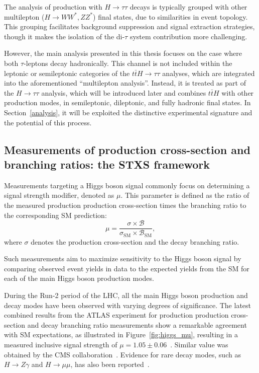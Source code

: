 The analysis of \ttH production with $H\to\tau\tau$ decays is typically grouped with other multilepton ($H\to WW^*, ZZ^*$) final states, due to similarities in event topology. This grouping facilitates background suppression and signal extraction strategies, though it makes the isolation of the di-$\tau$ system contribution more challenging. 

However, the main analysis presented in this thesis focuses on the case where both $\tau$-leptons decay hadronically. This channel is not included within the leptonic or semileptonic categories of the $t\bar{t}H \to \tau\tau$ analyses, which are integrated into the aforementioned ``multilepton analysis''. Instead, it is treated as part of the $H\to\tau\tau$ analysis, which will be introduced later and combines $t\bar{t}H$ with other production modes, in semileptonic, dileptonic, and fully hadronic final states. In Section~\ref{analysis}, it will be exploited the distinctive experimental signature and the potential of this process.



\subsection{Measurements of production cross-section and branching ratios: the STXS framework}
\label{sec:stxs_yukawa}


Measurements targeting a Higgs boson signal commonly focus on determining a signal strength modifier, denoted as $\mu$. This parameter is defined as the ratio of the measured production production cross-section times the branching ratio to the corresponding SM prediction:
\begin{equation}
\label{signal_strength}
    \mu = \frac{\sigma \times \mathcal{B}}{\sigma_{\mathrm{SM}} \times \mathcal{B}_{\mathrm{SM}}},
\end{equation}
where $\sigma$ denotes the production cross-section and  the decay branching ratio.

Such measurements aim to maximize sensitivity to the Higgs boson signal by comparing observed event yields in data to the expected yields from the SM for each of the main Higgs boson production modes.

During the Run-2 period of the LHC, all the main Higgs boson production and decay modes have been observed with varying degrees of significance. The latest combined results from the ATLAS experiment for production production cross-section and decay branching ratio measurements show a remarkable agreement with SM expectations, as illustrated in Figure~\ref{fig:higgs_mu}, resulting in a measured inclusive signal strength of $\mu = 1.05 \pm 0.06$~\cite{Nature_ATLAS}. Similar value was obtained by the CMS collaboration~\cite{CMS:2022dwd}. Evidence for rare decay modes, such as $H \to Z\gamma$ and $H \to \mu\mu$, has also been reported~\cite{Aad_2024,muon2021}.

